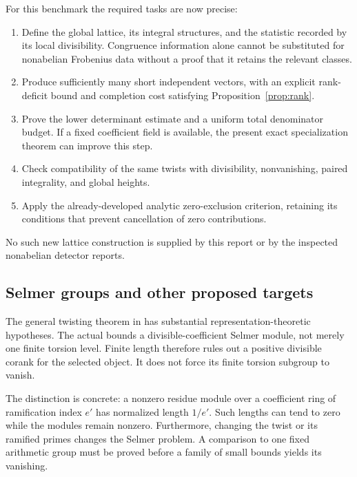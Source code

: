 For this benchmark the required tasks are now precise:
\begin{enumerate}
\item Define the global lattice, its integral structures, and the statistic recorded by its local divisibility. Congruence information alone cannot be substituted for nonabelian Frobenius data without a proof that it retains the relevant classes.
\item Produce sufficiently many short independent vectors, with an explicit rank-deficit bound and completion cost satisfying Proposition~\ref{prop:rank}.
\item Prove the lower determinant estimate and a uniform total denominator budget. If a fixed coefficient field is available, the present exact specialization theorem can improve this step.
\item Check compatibility of the same twists with divisibility, nonvanishing, paired integrality, and global heights.
\item Apply the already-developed analytic zero-exclusion criterion, retaining its conditions that prevent cancellation of zero contributions.
\end{enumerate}
No such new lattice construction is supplied by this report or by the inspected nonabelian detector reports.

\subsection{Selmer groups and other proposed targets}
The general twisting theorem in
has substantial representation-theoretic hypotheses. The actual
bounds a divisible-coefficient Selmer module, not merely one finite torsion level. Finite length therefore rules out a positive divisible corank for the selected object. It does not force its finite torsion subgroup to vanish.

The distinction is concrete: a nonzero residue module over a coefficient ring of ramification index $e'$ has normalized length $1/e'$. Such lengths can tend to zero while the modules remain nonzero. Furthermore, changing the twist or its ramified primes changes the Selmer problem. A comparison to one fixed arithmetic group must be proved before a family of small bounds yields its vanishing.

